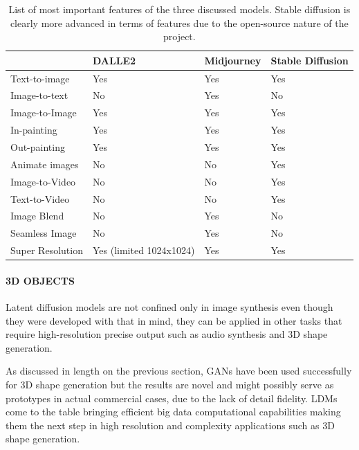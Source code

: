 \documentclass[a4paper,one side,12pt]{book}
\begin{document}
\begin{table}[H]
    \centering  
    \begin{tabular}
    {|m{7em}||m{5em}||m{5em}||m{5em}|}
    \hline
         &DALLE2   &Midjourney	&Stable \newline Diffusion \\
    \hline
         	 
Text-to-image	&Yes	&Yes	       &Yes\\
\hline
Image-to-text	&No	    &Yes	       &No\\
\hline
Image-to-Image	&Yes	&Yes	       &Yes\\
\hline
In-painting	    &Yes	&Yes	       &Yes\\
\hline
Out-painting	&Yes	&Yes	       &Yes\\
\hline
Animate images	&No	    &No	           &Yes\\
\hline
Image-to-Video	&No	    &No	           &Yes\\
\hline
Text-to-Video	&No	    &No	           &Yes\\
\hline
Image Blend	    &No	    &Yes	       &No\\
\hline
Seamless Image	&No	    &Yes	       &No\\
\hline
Super Resolution &Yes (limited 1024x1024)	&Yes	&Yes\\
    \hline
    \end{tabular}
    \caption{List of most important features of the three discussed
models. Stable diffusion is clearly more advanced in terms of features
due to the open-source nature of the project.}
\end{table} 
 

\paragraph{3D OBJECTS\\}

Latent diffusion models are not confined only in image synthesis even
though they were developed with that in mind, they can be applied in
other tasks that require high-resolution precise output such as audio
synthesis and 3D shape generation.

As discussed in length on the previous section, GANs have been used
successfully for 3D shape generation but the results are novel and might
possibly serve as prototypes in actual commercial cases, due to the lack
of detail fidelity. LDMs come to the table bringing efficient big data
computational capabilities making them the next step in high resolution
and complexity applications such as 3D shape generation.
\end{document}
